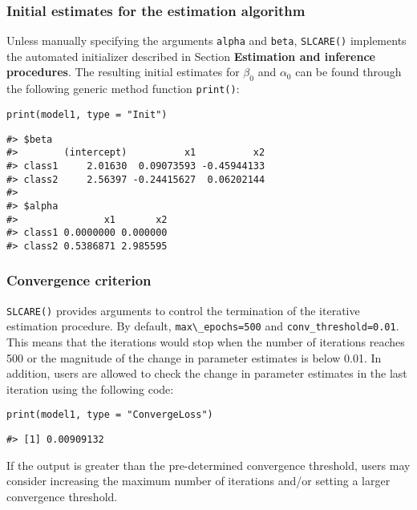 \hypertarget{initial-estimates-for-the-estimation-algorithm}{%
\subsubsection{Initial estimates for the estimation algorithm}\label{initial-estimates-for-the-estimation-algorithm}}

Unless manually specifying the arguments \texttt{alpha} and \texttt{beta}, \texttt{SLCARE()} implements the automated initializer described in Section \textbf{Estimation and inference procedures}.
The resulting initial estimates for \({\beta_0}\) and \({\alpha_0}\) can be found through the following generic method function \texttt{print()}:

\begin{verbatim}
print(model1, type = "Init")
\end{verbatim}

\begin{verbatim}
#> $beta
#>        (intercept)          x1          x2
#> class1     2.01630  0.09073593 -0.45944133
#> class2     2.56397 -0.24415627  0.06202144
#> 
#> $alpha
#>               x1       x2
#> class1 0.0000000 0.000000
#> class2 0.5386871 2.985595
\end{verbatim}

\hypertarget{convergence-criterion}{%
\subsubsection{Convergence criterion}\label{convergence-criterion}}

\texttt{SLCARE()} provides arguments to control the termination of the iterative estimation procedure. By default, \texttt{max\textbackslash{}\_epochs=500} and \texttt{conv\_threshold=0.01}. This means that the iterations would stop when the number of iterations reaches 500 or the magnitude of the change in parameter estimates is below 0.01. In addition, users are allowed to check the change in parameter estimates in the last
iteration using the following code:

\begin{verbatim}
print(model1, type = "ConvergeLoss")
\end{verbatim}

\begin{verbatim}
#> [1] 0.00909132
\end{verbatim}

If the output is greater than the pre-determined convergence threshold, users may consider increasing the maximum number of iterations and/or setting a larger convergence threshold.

